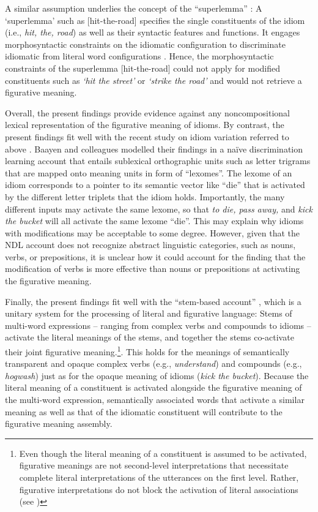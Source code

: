 \documentclass[output=paper]{langsci/langscibook}
\begin{document}
A similar assumption underlies the concept of the ``superlemma'' \citep{sprenger:2006}: A ‘superlemma’ such as [hit-the-road] specifies the single constituents of the idiom (i.e., \textit{hit, the, road}) as well as their syntactic features and functions. It engages morphosyntactic constraints on the idiomatic configuration to discriminate idiomatic from literal word configurations \citep{sprenger:2006}. Hence, the morphosyntactic constraints of the superlemma [hit-the-road] could not apply for modified constituents such as \textit{‘hit the street’} or \textit{‘strike the road’} and would not retrieve a figurative meaning. 


Overall, the present findings provide evidence against any noncompositional lexical representation of the figurative meaning of idioms. By contrast, the present findings fit well with the recent study on idiom variation referred to above \citep{geeraert:2017}. Baayen and colleagues modelled their findings in a naïve discrimination learning account \citep{baayen:2013,baayen:2011,baayen:2016} that entails sublexical orthographic units such as letter trigrams that are mapped onto meaning units in form of ``lexomes''. The lexome of an idiom corresponds to a pointer to its semantic vector like ``die'' that is activated by the different letter triplets that the idiom holds. Importantly, the many different inputs may activate the same lexome, so that \textit{to die, pass away,} and \textit{kick the bucket} will all activate the same lexome ``die''. This may explain why idioms with modifications may be acceptable to some degree. However, given that the NDL account does not recognize abstract linguistic categories, such as nouns, verbs, or prepositions, it is unclear how it could account for the finding that the modification of verbs is more effective than nouns or prepositions at activating the figurative meaning. 

Finally, the present findings fit well with the ``stem-based account'' \citep{gunther:2018,rabanus:2008,smolka:2015,smolka:2017,smolka:2018,smolka:2014,smolka:2007}, which is a unitary system for the processing of literal and figurative language: Stems of multi-word expressions -- ranging from complex verbs and compounds to idioms -- activate the literal meanings of the stems, and together the stems co-activate their joint figurative meaning.\footnote{Even though the literal meaning of a constituent is assumed to be activated, figurative meanings are not second-level interpretations that necessitate complete literal interpretations of the utterances on the first level. Rather, figurative interpretations do not block the activation of literal associations (see \citealt{gibbs:2002})}. This holds for the meanings of semantically transparent and opaque complex verbs (e.g., \textit{understand}) and compounds (e.g., \textit{hogwash}) just as for the opaque meaning of idioms (\textit{kick the bucket}). Because the literal meaning of a constituent is activated alongside the figurative meaning of the multi-word expression, semantically associated words that activate a similar meaning as well as that of the idiomatic constituent will contribute to the figurative meaning assembly. 
\end{document}
